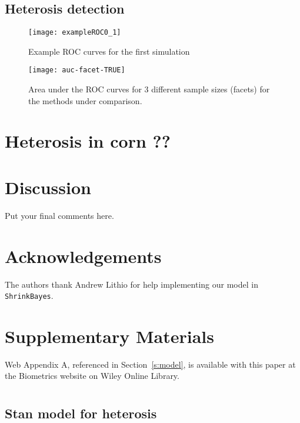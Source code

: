 \documentclass[useAMS,referee]{biom}
\begin{document}
\subsection{Heterosis detection}

\begin{figure}[htbp]
\texttt{[image: exampleROC0\_1]}
\caption{Example ROC curves for the first simulation}
\label{f:roc}
\end{figure}

\begin{figure}[htbp]
\texttt{[image: auc-facet-TRUE]}
\caption{Area under the ROC curves for 3 different sample sizes (facets) for the methods under comparison.}
\end{figure}

\section{Heterosis in corn ??}
\label{s:corn}

\section{Discussion}
\label{s:discuss}

Put your final comments here. 



\backmatter %



\section*{Acknowledgements}

The authors thank Andrew Lithio for help implementing our model in {\tt ShrinkBayes}.


\section*{Supplementary Materials}

Web Appendix A, referenced in Section~\ref{s:model}, is available with
this paper at the Biometrics website on Wiley Online
Library.\vspace*{-8pt}




\appendix


\section{}
\subsection{Stan model for heterosis}



\label{lastpage}
\end{document}
